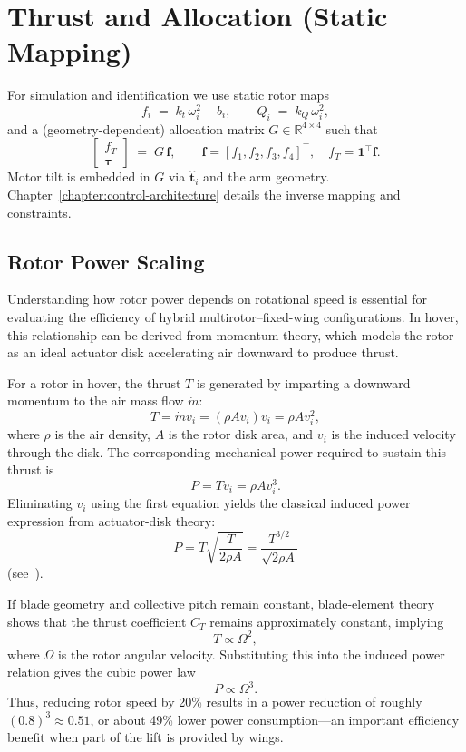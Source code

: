 \section{Thrust and Allocation (Static Mapping)}
For simulation and identification we use static rotor maps
\[
f_i \;=\; k_t\,\omega_i^2 + b_i,\qquad Q_i \;=\; k_Q\,\omega_i^2,
\]
and a (geometry-dependent) allocation matrix $G\in\mathbb{R}^{4\times 4}$ such that
\[
\begin{bmatrix} f_T\\ \boldsymbol{\tau} \end{bmatrix}
\;=\; G\,\mathbf{f},\qquad
\mathbf{f}=[f_1,f_2,f_3,f_4]^\top,\quad f_T=\mathbf{1}^\top\mathbf{f}.
\]
Motor tilt is embedded in $G$ via $\hat{\mathbf{t}}_i$ and the arm geometry. Chapter~\ref{chapter:control-architecture} details the inverse mapping and constraints.

\subsection{Rotor Power Scaling}\label{sec:rotor-power}
Understanding how rotor power depends on rotational speed is essential for evaluating the efficiency of hybrid multirotor–fixed-wing configurations. In hover, this relationship can be derived from momentum theory, which models the rotor as an ideal actuator disk accelerating air downward to produce thrust.

For a rotor in hover, the thrust $T$ is generated by imparting a downward momentum to the air mass flow $\dot{m}$:
\[
T = \dot{m} v_i = (\rho A v_i) v_i = \rho A v_i^2,
\]
where $\rho$ is the air density, $A$ is the rotor disk area, and $v_i$ is the induced velocity through the disk. The corresponding mechanical power required to sustain this thrust is
\[
P = T v_i = \rho A v_i^3.
\]
Eliminating $v_i$ using the first equation yields the classical induced power expression from actuator-disk theory:
\[
P = T \sqrt{\frac{T}{2\rho A}} = \frac{T^{3/2}}{\sqrt{2\rho A}}
\]
(see~\cite{faa_hfh_2023}).

If blade geometry and collective pitch remain constant, blade-element theory shows that the thrust coefficient $C_T$ remains approximately constant, implying
\[
T \propto \Omega^2,
\]
where $\Omega$ is the rotor angular velocity. Substituting this into the induced power relation gives the cubic power law
\[
P \propto \Omega^3.
\]
Thus, reducing rotor speed by 20\% results in a power reduction of roughly $(0.8)^3 \approx 0.51$, or about 49\% lower power consumption—an important efficiency benefit when part of the lift is provided by wings.


